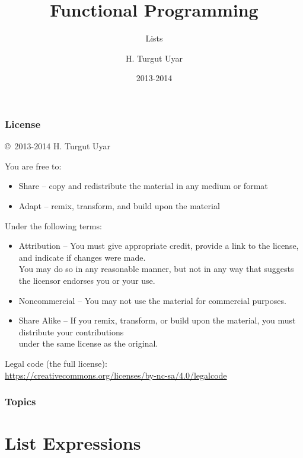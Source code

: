 \documentclass[dvipsnames]{beamer}
\title{Functional Programming}
\subtitle{Lists}
\author{H. Turgut Uyar}
\date{2013-2014}
\theoremstyle{plain}
\begin{document}

\begin{frame}
  \titlepage
\end{frame}

\begin{frame}
  \frametitle{License}

  \hfill
  \copyright~2013-2014 H. Turgut Uyar

  \vfill
  \begin{tiny}
    You are free to:
    \begin{itemize}
      \item Share -- copy and redistribute the material in any medium or format
      \item Adapt -- remix, transform, and build upon the material
    \end{itemize}

    Under the following terms:
    \begin{itemize}
      \item Attribution -- You must give appropriate credit, provide a link to
        the license, and indicate if changes were made.\\
        You may do so in any reasonable manner, but not in any way
        that suggests the licensor endorses you or your use.

      \item Noncommercial -- You may not use the material for commercial
        purposes.

      \item Share Alike -- If you remix, transform, or build upon the material,
        you must distribute your contributions\\
        under the same license as the original.
    \end{itemize}
  \end{tiny}

  \vfill
  \begin{small}
    Legal code (the full license):\\
    \url{https://creativecommons.org/licenses/by-nc-sa/4.0/legalcode}
  \end{small}
\end{frame}

\begin{frame}
  \frametitle{Topics}
  \tableofcontents
\end{frame}

\section{List Expressions}
\end{document}

